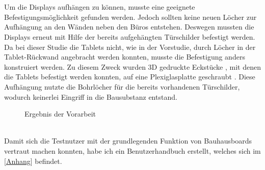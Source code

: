 \\
\\
Um die Displays aufhängen zu können, musste eine geeignete Befestigungsmöglichkeit gefunden werden.
Jedoch sollten keine neuen Löcher zur Aufhängung an den Wänden neben den Büros entstehen.
Deswegen mussten die Displays erneut mit Hilfe der bereits aufgehängten Türschilder befestigt werden.
Da bei dieser Studie die Tablets nicht, wie in der Vorstudie, durch Löcher in der Tablet-Rückwand angebracht werden konnten, musste die Befestigung anders konstruiert werden.
Zu diesem Zweck wurden 3D gedruckte Eckstücke , mit denen die Tablets befestigt werden konnten, auf eine Plexiglasplatte geschraubt .
Diese Aufhängung nutzte die Bohrlöcher für die bereits vorhandenen Türschilder, wodurch keinerlei Eingriff in die Bausubstanz entstand.
\begin{figure}%
  \centering
  \caption{Ergebnis der Vorarbeit}
  \label{img:Vorarbeit}
\end{figure}
\\
Damit sich die Testnutzer mit der grundlegenden Funktion von Bauhausboards vertraut machen konnten, habe ich ein Benutzerhandbuch erstellt, welches sich im [\hyperref[benutzerhandbuch]{Anhang}] befindet.

